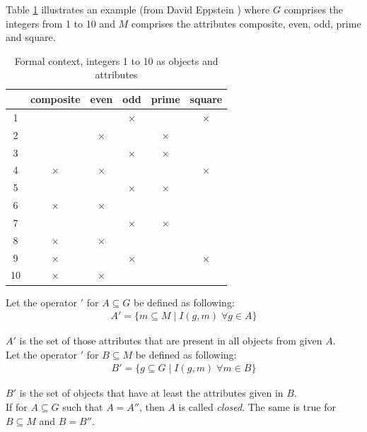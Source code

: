 \documentclass[11pt]{report}
\begin{document}
{{Table \ref{table:example} illustrates an example (from David Eppstein \cite{fcaexample}) where $G$ comprises the integers from 1 to 10 and $M$ comprises the attributes composite, even, odd, prime and square. \\


\begin{table}[h]
\caption{Formal context, integers 1 to 10 as objects and attributes}
\label{table:example}
\centering

\def\arraystretch{1.2}%
\begin{tabular}{ | c | c c c c c |}
\hline
  & composite & even & odd & prime & square\\
\hline

1 & & & $\times$ & &$\times$\\ 
2 & & $\times$ & & $\times$ &\\
3 & & & $\times$ & $\times$ &\\ 
4 & $\times$ & $\times$ & & & $\times$\\
5 & & & $\times$ & $\times$ &\\
6 & $\times$ & $\times$ & & &\\
7 & & & $\times$ & $\times$ &\\ 
8 & $\times$ & $\times$ & & &\\
9 & $\times$ & & $\times$ & & $\times$\\
10 & $\times$ & $\times$ & & &\\ \hline


\end{tabular}
\end{table}

Let the operator $'$ for $A \subseteq G$ be defined as following:
\begin{align*}
	A' = \{ m \subseteq M\; |\;  I(g, m)\;   \forall g \in A\}
\end{align*}

$A'$ is the set of those attributes that are present in all objects from given $A$. \\

Let the operator $'$ for $B \subseteq M$ be defined as following:
\begin{align*}
	B' = \{ g \subseteq G\; |\;  I(g, m)\;   \forall m \in B\}
\end{align*}

$B'$ is the set of objects that have at least the attributes given in $B$. \\

If for $A \subseteq G$ such that $A = A''$, then $A$ is called \textit{closed}. The same is true for $B \subseteq M$ and $B = B''$. \\

}}
\end{document}
